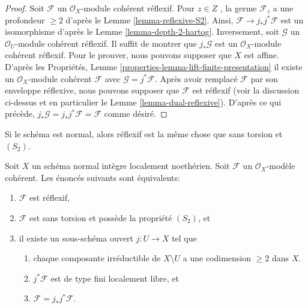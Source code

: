 \begin{proof}
Soit  $\mathcal{F}$  un  $\mathcal{O}_X$-module cohérent réflexif. Pour  $z \in Z$ , la
germe  $\mathcal{F}_z$  a une profondeur  $\geq 2$  d'après le Lemme  \ref{lemma-reflexive-S2}.
Ainsi,  $\mathcal{F} \to j_*j^*\mathcal{F}$  est un isomorphisme d'après le Lemme  \ref{lemma-depth-2-hartog}.
Inversement, soit  $\mathcal{G}$  un  $\mathcal{O}_U$-module cohérent réflexif. Il suffit
de montrer que  $j_*\mathcal{G}$  est un  $\mathcal{O}_X$-module cohérent réflexif. Pour le
prouver, nous pouvons supposer que  $X$  est affine. D'après les
Propriétés, Lemme  \ref{properties-lemma-lift-finite-presentation}  il existe un  $\mathcal{O}_X$-module cohérent
 $\mathcal{F}$  avec  $\mathcal{G} = j^*\mathcal{F}$. Après avoir remplacé  $\mathcal{F}$  par son
enveloppe réflexive, nous pouvons supposer que  $\mathcal{F}$  est réflexif (voir la
discussion ci-dessus et en particulier le Lemme  \ref{lemma-dual-reflexive}). D'après ce qui
précède,  $j_*\mathcal{G} = j_*j^*\mathcal{F} = \mathcal{F}$  comme désiré.
\end{proof}

\noindent
Si le schéma est normal, alors réflexif est la même chose que sans torsion et
 $(S_2)$.

\begin{lemma}
\label{lemma-reflexive-over-normal}
Soit  $X$  un schéma normal intègre localement noethérien. Soit
 $\mathcal{F}$  un  $\mathcal{O}_X$-modèle cohérent. Les énoncés suivants sont
équivalents:
\begin{enumerate}
\item $\mathcal{F}$  est réflexif,
\item $\mathcal{F}$  est sans torsion et possède la propriété  $(S_2)$, et
\item il existe un sous-schéma ouvert  $j : U \to X$  tel que
\begin{enumerate}
\item chaque composante irréductible de  $X \setminus U$  a une codimension  $\geq 2$  dans
 $X$.
\item $j^*\mathcal{F}$  est de type fini localement libre, et
\item $\mathcal{F} = j_*j^*\mathcal{F}$.
\end{enumerate}
\end{enumerate}
\end{lemma}

